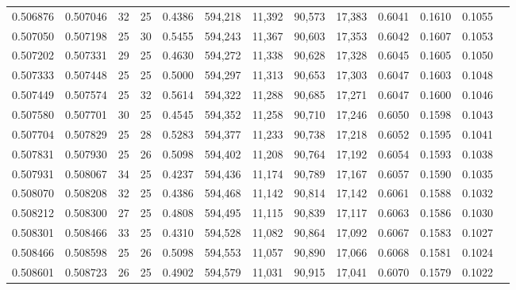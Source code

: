 \begin{tabular}{rrrrrrrrrrrrr}
0.506876 & 0.507046 &    32 &  25 &                                     0.4386 & 594,218 &  11,392 &  90,573 &  17,383 & 0.6041 & 0.1610 & 0.1055 \\
0.507050 & 0.507198 &    25 &  30 &                                     0.5455 & 594,243 &  11,367 &  90,603 &  17,353 & 0.6042 & 0.1607 & 0.1053 \\
0.507202 & 0.507331 &    29 &  25 &                                     0.4630 & 594,272 &  11,338 &  90,628 &  17,328 & 0.6045 & 0.1605 & 0.1050 \\
0.507333 & 0.507448 &    25 &  25 &                                     0.5000 & 594,297 &  11,313 &  90,653 &  17,303 & 0.6047 & 0.1603 & 0.1048 \\
0.507449 & 0.507574 &    25 &  32 &                                     0.5614 & 594,322 &  11,288 &  90,685 &  17,271 & 0.6047 & 0.1600 & 0.1046 \\
0.507580 & 0.507701 &    30 &  25 &                                     0.4545 & 594,352 &  11,258 &  90,710 &  17,246 & 0.6050 & 0.1598 & 0.1043 \\
0.507704 & 0.507829 &    25 &  28 &                                     0.5283 & 594,377 &  11,233 &  90,738 &  17,218 & 0.6052 & 0.1595 & 0.1041 \\
0.507831 & 0.507930 &    25 &  26 &                                     0.5098 & 594,402 &  11,208 &  90,764 &  17,192 & 0.6054 & 0.1593 & 0.1038 \\
0.507931 & 0.508067 &    34 &  25 &                                     0.4237 & 594,436 &  11,174 &  90,789 &  17,167 & 0.6057 & 0.1590 & 0.1035 \\
0.508070 & 0.508208 &    32 &  25 &                                     0.4386 & 594,468 &  11,142 &  90,814 &  17,142 & 0.6061 & 0.1588 & 0.1032 \\
0.508212 & 0.508300 &    27 &  25 &                                     0.4808 & 594,495 &  11,115 &  90,839 &  17,117 & 0.6063 & 0.1586 & 0.1030 \\
0.508301 & 0.508466 &    33 &  25 &                                     0.4310 & 594,528 &  11,082 &  90,864 &  17,092 & 0.6067 & 0.1583 & 0.1027 \\
0.508466 & 0.508598 &    25 &  26 &                                     0.5098 & 594,553 &  11,057 &  90,890 &  17,066 & 0.6068 & 0.1581 & 0.1024 \\
0.508601 & 0.508723 &    26 &  25 &                                     0.4902 & 594,579 &  11,031 &  90,915 &  17,041 & 0.6070 & 0.1579 & 0.1022 \\

\end{tabular}
